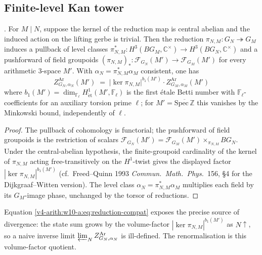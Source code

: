 \subsection{Finite-level Kan tower}
\label{v4-arith:w10-a:kan-tower}

\begin{lemma}
\label{v4-arith:w10-a:lem:reduction}
\ClaimStatusProvedHereConditional. For \(M\mid N\), suppose the kernel
of the reduction map is central abelian and the induced action on the
lifting gerbe is trivial. Then the reduction
\(\pi_{N,M}:G_{N}\twoheadrightarrow G_{M}\) induces a pullback of
level classes
\(\pi_{N,M}^{*}:H^{3}(BG_{M},\mathbb C^{\times})\to H^{3}(BG_{N},\mathbb C^{\times})\)
and a pushforward of field groupoids
\((\pi_{N,M})_{*}:\mathcal F_{G_{N}}(M')\to\mathcal F_{G_{M}}(M')\)
for every arithmetic 3-space \(M'\). With \(\alpha_{N}=\pi_{N,M}^{*}\alpha_{M}\)
consistent, one has
\begin{equation}
\label{v4-arith:w10-a:eq:reduction-compat}
Z^{\mathrm{Ar}}_{G_{N},\alpha_{N}}(M')
\;=\;\bigl|\ker\pi_{N,M}\bigr|^{b_{1}(M')}\cdot Z^{\mathrm{Ar}}_{G_{M},\alpha_{M}}(M')
\end{equation}
where \(b_{1}(M')=\dim_{\mathbb F_{\ell}}H^{1}_{\mathrm{\acute et}}(M',\mathbb F_{\ell})\)
is the first \'etale Betti number with \(\mathbb{F}_{\ell}\)-coefficients for an
auxiliary torsion prime \(\ell\); for \(M'=\overline{\mathrm{Spec}\,\mathbb{Z}}\)
this vanishes by the Minkowski bound, independently of \(\ell\).
\end{lemma}

\begin{proof}
The pullback of cohomology is functorial; the pushforward of field
groupoids is the restriction of scalars
\(\mathcal F_{G_{N}}(M')=\mathcal F_{G_{M}}(M')\times_{\pi_{N,M}}BG_{N}\).
Under the central-abelian hypothesis, the finite-groupoid cardinality
of the kernel of \(\pi_{N,M}\) acting free-transitively on the
\(H^{1}\)-twist gives the displayed factor
\(|\ker\pi_{N,M}|^{b_{1}(M')}\) (cf.\ Freed--Quinn 1993
\emph{Commun.~Math.~Phys.}~156, \S4 for the Dijkgraaf--Witten
version). The level class \(\alpha_{N}=\pi_{N,M}^{*}\alpha_{M}\)
multiplies each field by its \(G_{M}\)-image phase, unchanged by the
torsor of reductions.
\end{proof}

\begin{remark}
\label{v4-arith:w10-a:rem:divergence-factor}
Equation \eqref{v4-arith:w10-a:eq:reduction-compat} exposes the
precise source of divergence: the state sum grows by the
volume-factor \(|\ker\pi_{N,M}|^{b_{1}(M')}\) as \(N\uparrow\), so a
naive inverse limit
\(\varprojlim_{N}Z^{\mathrm{Ar}}_{G_{N},\alpha_{N}}\) is ill-defined.
The renormalisation is this volume-factor quotient.
\end{remark}

